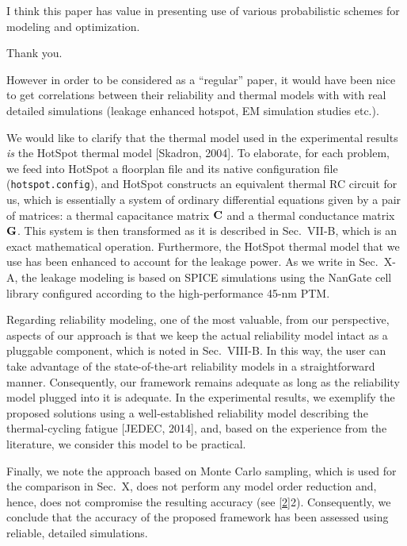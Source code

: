 \begin{reviewer}
I think this paper has value in presenting use of various probabilistic schemes
for modeling and optimization.
\end{reviewer}

\begin{authors}
  Thank you.
\end{authors}

\begin{reviewer}
However in order to be considered as a ``regular'' paper, it would have been
nice to get correlations between their reliability and thermal models with with
real detailed simulations (leakage enhanced hotspot, EM simulation studies
etc.).
\end{reviewer}

\begin{authors}
We would like to clarify that the thermal model used in the experimental results
\emph{is} the HotSpot thermal model [Skadron, 2004]. To elaborate, for each
problem, we feed into HotSpot a floorplan file and its native configuration file
(\texttt{hotspot.config}), and HotSpot constructs an equivalent thermal RC
circuit for us, which is essentially a system of ordinary differential equations
given by a pair of matrices: a thermal capacitance matrix $\mathbf{C}$ and a thermal
conductance matrix $\mathbf{G}$. This system is then transformed as it is described
in Sec.~VII-B, which is an exact mathematical operation. Furthermore, the
HotSpot thermal model that we use has been enhanced to account for the leakage
power. As we write in Sec.~X-A, the leakage modeling is based on SPICE
simulations using the NanGate cell library configured according to the
high-performance 45-nm PTM.

Regarding reliability modeling, one of the most valuable, from our perspective,
aspects of our approach is that we keep the actual reliability model intact as a
pluggable component, which is noted in Sec.~VIII-B. In this way, the user can
take advantage of the state-of-the-art reliability models in a straightforward
manner. Consequently, our framework remains adequate as long as the reliability
model plugged into it is adequate. In the experimental results, we exemplify the
proposed solutions using a well-established reliability model describing the
thermal-cycling fatigue [JEDEC, 2014], and, based on the experience from the
literature, we consider this model to be practical.

Finally, we note the approach based on Monte Carlo sampling, which is used for
the comparison in Sec.~X, does not perform any model order reduction and, hence,
does not compromise the resulting accuracy (see \cref{2}{2}). Consequently, we
conclude that the accuracy of the proposed framework has been assessed using
reliable, detailed simulations.

\begin{actions}
\end{actions}
\end{authors}

